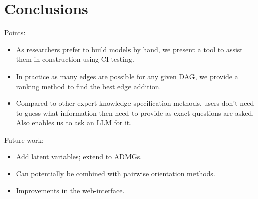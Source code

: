 \documentclass{uai2025} %
\begin{document}
\section{Conclusions}

Points:
\begin{itemize}
	\item As researchers prefer to build models by hand, we present a tool
		to assist them in construction using CI testing.
	\item In practice as many edges are possible for any given DAG, we provide
		a ranking method to find the best edge addition.
	\item Compared to other expert knowledge specification methods, users
		don't need to guess what information then need to provide as
		exact questions are asked. Also enables us to ask an LLM for
		it.
\end{itemize}

Future work:
\begin{itemize}
	\item Add latent variables; extend to ADMGs.
	\item Can potentially be combined with pairwise orientation methods.
	\item Improvements in the web-interface.
\end{itemize}



\newpage


\end{document}
